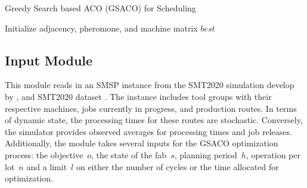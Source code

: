 \documentclass[runningheads]{llncs}
\begin{document}
\begin{algorithm}[t]
	\caption{Greedy Search based ACO (GSACO) for Scheduling}
	\label{gsaco}
	Initialize adjacency, pheromone, and machine matrix\; 
	\Return $\mathit{best}$\;
\end{algorithm}


\subsection{Input Module}

This module reads in an SMSP instance from the SMT2020 simulation develop by \cite{Kovács2022}, 
and SMT2020 dataset \cite{kopp2020smt2020}.
The instance includes tool groups with their respective machines, jobs currently in progress, and production routes. In terms of dynamic state, the processing times for these routes are stochastic. Conversely, the simulator provides observed averages for processing times and job releases. Additionally, the module takes several inputs for the GSACO optimization process: the objective~$o$, the state of the fab~$s$, planning period~$h$, 
operation per lot~$n$ and a limit~$l$ on either the number of cycles or the time allocated for optimization.
\end{document}
